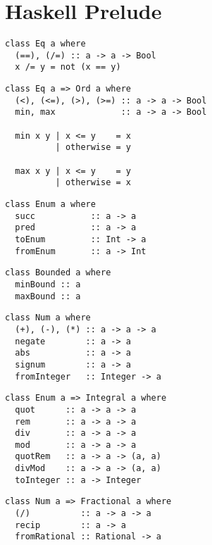 \cleardoublepage
\chapter{Haskell Prelude}
\label{ch:prelude}

\renewcommand{\haskellIn}[1]{\texttt{#1}}

\begin{multicols}{2}\scriptsize 
\begin{verbatim}
class Eq a where
  (==), (/=) :: a -> a -> Bool
  x /= y = not (x == y)
\end{verbatim}
	
\begin{verbatim}
class Eq a => Ord a where
  (<), (<=), (>), (>=) :: a -> a -> Bool
  min, max             :: a -> a -> Bool

  min x y | x <= y    = x
          | otherwise = y

  max x y | x <= y    = y
          | otherwise = x
\end{verbatim}
	
\begin{verbatim}
class Enum a where
  succ           :: a -> a 
  pred           :: a -> a
  toEnum         :: Int -> a
  fromEnum       :: a -> Int 
\end{verbatim}
	
\begin{verbatim}
class Bounded a where
  minBound :: a 
  maxBound :: a
\end{verbatim}
	
\begin{verbatim}
class Num a where 
  (+), (-), (*) :: a -> a -> a
  negate        :: a -> a
  abs           :: a -> a
  signum        :: a -> a
  fromInteger   :: Integer -> a
\end{verbatim}
	
\begin{verbatim}
class Enum a => Integral a where 
  quot      :: a -> a -> a
  rem       :: a -> a -> a
  div       :: a -> a -> a
  mod       :: a -> a -> a
  quotRem   :: a -> a -> (a, a)
  divMod    :: a -> a -> (a, a)
  toInteger :: a -> Integer
\end{verbatim}
	
\begin{verbatim}
class Num a => Fractional a where
  (/)          :: a -> a -> a
  recip        :: a -> a
  fromRational :: Rational -> a
\end{verbatim}
	

\end{multicols}
